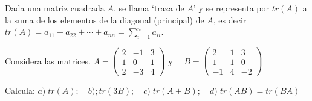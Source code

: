 \begin{ejre}
	Dada una matriz cuadrada $A$, se llama `traza de $A$' y se representa por $tr(A)$ a la suma de los elementos de la diagonal (principal) de $A$, es decir $\displaystyle tr(A)=a_{11}+a_{22}+ \cdots + a_{nn}=\sum_{i=1}^n a_{ii}$.
	
\noindent Considera las matrices. 
	$A=\left( \begin{matrix} 2&-1&3\\1&0&1\\2&-3&4   \end{matrix} \right) \text{ y } \quad 
	B=\left( \begin{matrix} 2&1&3\\1&1&0\\-1&4&-2  \end{matrix} \right)$
	
\noindent Calcula: $a)\; tr(A); \quad b); tr(3B); \quad c)\; tr(A+B); \quad d)\; tr(AB)=tr(BA)$
\end{ejre}

